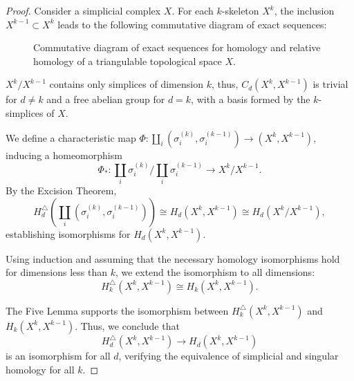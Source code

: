 \begin{proof}
	Consider a simplicial complex $X$. For each $k$-skeleton $X^{k}$, the inclusion $X^{k-1} \subset X^{k}$ leads to the following commutative diagram of exact sequences:
			
	\begin{figure}[h]
		\centering
		\caption{Commutative diagram of exact sequences for homology and relative homology of a triangulable topological space $X$.}
	\end{figure}
			
	$X^{k}/X^{k-1}$ contains only simplices of dimension $k$, thus, $C_{d}(X^{k}, X^{k-1})$ is trivial for $d \neq k$ and a free abelian group for $d = k$, with a basis formed by the $k$-simplices of $X$.
			
	We define a characteristic map $\Phi: \coprod_{i}(\sigma^{(k)}_{i}, \sigma^{(k-1)}_{i}) \rightarrow (X^{k}, X^{k-1})$, inducing a homeomorphism
	\[
		\Phi_\ast: \coprod_{i} \sigma^{(k)}_{i}/\coprod_{i} \sigma^{(k-1)}_{i} \rightarrow X^{k}/X^{k-1}.
	\]
	By the Excision Theorem, 
	\[
		H^\triangle_{d}\left(\coprod_{i} (\sigma^{(k)}_{i}, \sigma^{(k-1)}_{i})\right) \cong H_{d}(X^{k}, X^{k-1}) \cong H_{d}(X^{k}/X^{k-1}),
	\]
	establishing isomorphisms for $H_{d}(X^{k}, X^{k-1})$.
			
	Using induction and assuming that the necessary homology isomorphisms hold for dimensions less than $k$, we extend the isomorphism to all dimensions:
	\begin{equation}
		H_{k}^{\triangle}(X^{k},X^{k-1}) \cong H_{k}(X^{k},X^{k-1}).
	\end{equation}
			
	The Five Lemma supports the isomorphism between $H_{k}^{\triangle}(X^{k}, X^{k-1})$ and $H_{k}(X^{k}, X^{k-1})$. Thus, we conclude that 
	\[
		H_{d}^{\triangle}(X^{k}, X^{k-1}) \rightarrow H_{d}(X^{k}, X^{k-1})
	\]
	is an isomorphism for all $d$, verifying the equivalence of simplicial and singular homology for all $k$.
\end{proof}